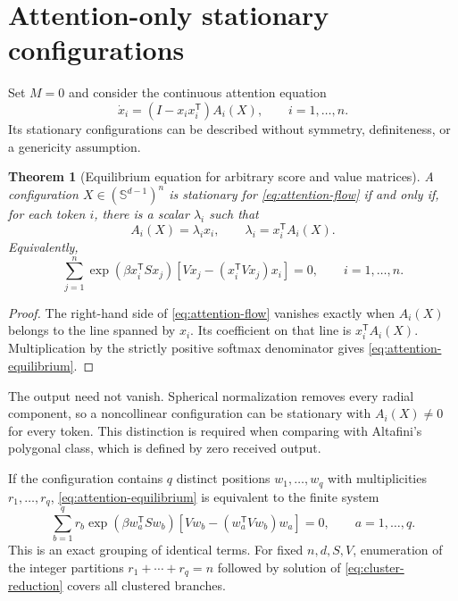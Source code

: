 \documentclass[11pt,a4paper]{article}
\newtheorem{theorem}{Theorem}[section]
\theoremstyle{definition}
\newcommand{\sphere}{\mathbb S}
\newcommand{\T}{\mathsf T}
\begin{document}
\section{Attention-only stationary configurations}
\label{sec:attention-equilibria}

Set $M=0$ and consider the continuous attention equation
\begin{equation}
 \dot x_i=(I-x_ix_i^{\T})A_i(X),\qquad i=1,\ldots,n.
 \label{eq:attention-flow}
\end{equation}
Its stationary configurations can be described without symmetry, definiteness, or a
genericity assumption.

\begin{theorem}[Equilibrium equation for arbitrary score and value matrices]
\label{thm:attention-equilibrium}
A configuration $X\in(\sphere^{d-1})^n$ is stationary for
\eqref{eq:attention-flow} if and only if, for each token $i$, there is a scalar
$\lambda_i$ such that
\begin{equation}
 A_i(X)=\lambda_i x_i,
 \qquad \lambda_i=x_i^{\T}A_i(X).
 \label{eq:attention-radial}
\end{equation}
Equivalently,
\begin{equation}
 \sum_{j=1}^n \exp(\beta x_i^{\T}Sx_j)
 \left[Vx_j-(x_i^{\T}Vx_j)x_i\right]=0,
 \qquad i=1,\ldots,n.
 \label{eq:attention-equilibrium}
\end{equation}
\end{theorem}

\begin{proof}
The right-hand side of \eqref{eq:attention-flow} vanishes exactly when $A_i(X)$
belongs to the line spanned by $x_i$.  Its coefficient on that line is
$x_i^{\T}A_i(X)$.  Multiplication by the strictly positive softmax denominator gives
\eqref{eq:attention-equilibrium}.
\end{proof}

The output need not vanish.  Spherical normalization removes every radial component,
so a noncollinear configuration can be stationary with $A_i(X)\ne0$ for every token.
This distinction is required when comparing with Altafini's polygonal class, which is
defined by zero received output.

If the configuration contains $q$ distinct positions $w_1,\ldots,w_q$ with
multiplicities $r_1,\ldots,r_q$, \eqref{eq:attention-equilibrium} is equivalent to
the finite system
\begin{equation}
 \sum_{b=1}^q r_b\exp(\beta w_a^{\T}Sw_b)
 \left[Vw_b-(w_a^{\T}Vw_b)w_a\right]=0,
 \qquad a=1,\ldots,q.
 \label{eq:cluster-reduction}
\end{equation}
This is an exact grouping of identical terms.  For fixed $n,d,S,V$, enumeration of
the integer partitions $r_1+\cdots+r_q=n$ followed by solution of
\eqref{eq:cluster-reduction} covers all clustered branches.
\end{document}
